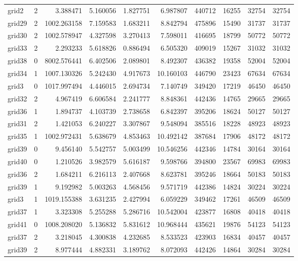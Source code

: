 \begin{longtable}{|l|r|r|r|r|r|r|r|r|r|}
grid2 & 2 & 3.388471 & 5.160056 & 1.827751 & 6.987807 & 440712 & 16255 & 32754 & 32754 \\
grid29 & 2 & 1002.263158 & 7.159583 & 1.683211 & 8.842794 & 475896 & 15490 & 31737 & 31737 \\
grid30 & 2 & 1002.578947 & 4.327598 & 3.270413 & 7.598011 & 416695 & 18799 & 50772 & 50772 \\
grid33 & 2 & 2.293233 & 5.618826 & 0.886494 & 6.505320 & 409019 & 15267 & 31032 & 31032 \\
grid38 & 0 & 8002.576441 & 6.402506 & 2.089801 & 8.492307 & 436382 & 19358 & 52004 & 52004 \\
grid34 & 1 & 1007.130326 & 5.242430 & 4.917673 & 10.160103 & 446790 & 23423 & 67634 & 67634 \\
grid3 & 0 & 1017.997494 & 4.446015 & 2.694734 & 7.140749 & 349420 & 17219 & 46450 & 46450 \\
grid32 & 2 & 4.967419 & 6.606584 & 2.241777 & 8.848361 & 442436 & 14765 & 29665 & 29665 \\
grid36 & 1 & 1.894737 & 4.103739 & 2.738658 & 6.842397 & 395206 & 18624 & 50127 & 50127 \\
grid31 & 2 & 1.421053 & 6.240227 & 3.307867 & 9.548094 & 385516 & 18228 & 48923 & 48923 \\
grid35 & 1 & 1002.972431 & 5.638679 & 4.853463 & 10.492142 & 387684 & 17906 & 48172 & 48172 \\
grid39 & 0 & 9.456140 & 5.542757 & 5.003499 & 10.546256 & 442346 & 14784 & 30164 & 30164 \\
grid40 & 0 & 1.210526 & 3.982579 & 5.616187 & 9.598766 & 394800 & 23567 & 69983 & 69983 \\
grid36 & 2 & 1.684211 & 6.216113 & 2.407668 & 8.623781 & 395246 & 18664 & 50183 & 50183 \\
grid39 & 1 & 9.192982 & 5.003263 & 4.568456 & 9.571719 & 442386 & 14824 & 30224 & 30224 \\
grid3 & 1 & 1019.155388 & 3.631235 & 2.427994 & 6.059229 & 349462 & 17261 & 46509 & 46509 \\
grid37 & 1 & 3.323308 & 5.255288 & 5.286716 & 10.542004 & 423877 & 16808 & 40418 & 40418 \\
grid41 & 0 & 1008.208020 & 5.136832 & 5.831612 & 10.968444 & 435621 & 19876 & 54123 & 54123 \\
grid37 & 2 & 3.218045 & 4.300838 & 4.232685 & 8.533523 & 423903 & 16834 & 40457 & 40457 \\
grid39 & 2 & 8.977444 & 4.882331 & 3.189762 & 8.072093 & 442426 & 14864 & 30284 & 30284 \\

\end{longtable}
